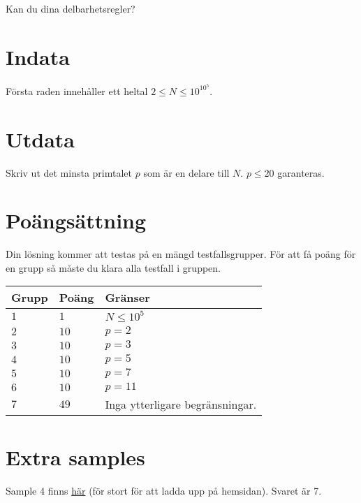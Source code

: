 \noindent
Kan du dina delbarhetsregler?

\noindent
\section*{Indata}
Första raden innehåller ett heltal $2 \leq N \leq 10^{10^5}$. 

\section*{Utdata}
Skriv ut det minsta primtalet $p$ som är en delare till $N$. $p \leq 20$ garanteras.

\section*{Poängsättning}
Din lösning kommer att testas på en mängd testfallsgrupper.
För att få poäng för en grupp så måste du klara alla testfall i gruppen.

\noindent
\begin{tabular}{| l | l | p{12cm} |}
  \hline
  \textbf{Grupp} & \textbf{Poäng} & \textbf{Gränser} \\ \hline
  $1$    & $1$          & $N \leq 10^5$  \\ \hline
  $2$    & $10$         & $p = 2$  \\ \hline
  $3$    & $10$         & $p = 3$  \\ \hline
  $4$    & $10$         & $p = 5$  \\ \hline
  $5$    & $10$         & $p = 7$  \\ \hline
  $6$    & $10$         & $p = 11$  \\ \hline
  $7$    & $49$         & Inga ytterligare begränsningar. \\ \hline
\end{tabular}

\section*{Extra samples}
Sample 4 finns \href{https://github.com/hairez/random-files/blob/main/cool-numbers-003.txt}{här} (för stort för att ladda upp på hemsidan).
Svaret är 7.
